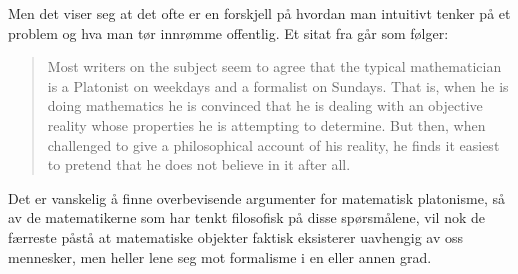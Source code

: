 \documentclass[12pt, norsk]{article}
\begin{document}
Men det viser seg at det ofte er en forskjell på hvordan man intuitivt tenker på et problem og hva man tør innrømme offentlig. Et sitat fra \cite[side 359]{mathematical_experience} går som følger: 

\begin{quote}
Most writers on the subject seem to agree that the typical mathematician is a Platonist on weekdays and a formalist on Sundays. That is, when he is doing mathematics he is convinced that he is dealing with an objective reality whose properties he is attempting to determine. But then, when challenged to give a philosophical account of his reality, he finds it easiest to pretend that he does not believe in it after all.
\end{quote}

Det er vanskelig å finne overbevisende argumenter for matematisk platonisme, så av de matematikerne som har tenkt filosofisk på disse spørsmålene, vil nok de færreste påstå at matematiske objekter faktisk eksisterer uavhengig av oss mennesker, men heller lene seg mot formalisme i en eller annen grad.


 

\end{document}
